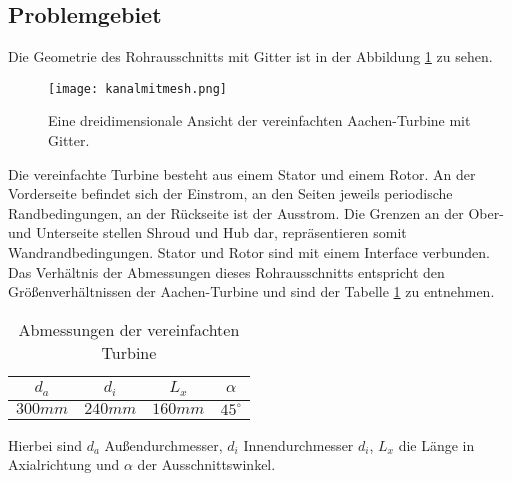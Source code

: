 \subsection{Problemgebiet}
\label{subsec:kanalproblemgebiet}
Die Geometrie des Rohrausschnitts mit Gitter ist in der Abbildung \ref{fig:kanalgebiet} zu sehen.
\begin{figure}[H]
\texttt{[image: kanalmitmesh.png]}
\caption{Eine dreidimensionale Ansicht der vereinfachten Aachen-Turbine mit Gitter.}
\label{fig:kanalgebiet}
\end{figure}
Die vereinfachte Turbine besteht aus einem Stator und einem Rotor. An der Vorderseite befindet sich der Einstrom, an den Seiten jeweils periodische Randbedingungen, an der Rückseite ist der Ausstrom. Die Grenzen an der Ober- und Unterseite stellen Shroud und Hub dar, repräsentieren somit Wandrandbedingungen. Stator und Rotor sind mit einem Interface verbunden. Das Verhältnis der Abmessungen dieses Rohrausschnitts entspricht den Größenverhältnissen der Aachen-Turbine und sind der Tabelle \ref{tab:kanalabmessungen} zu entnehmen.
\begin{table}[H]
\centering
\label{tab:kanalabmessungen}
\caption{Abmessungen der vereinfachten Turbine}
\begin{tabular}{ c| c| c| c}
 $d_a$&$d_i$&$L_x$&$\alpha$\\
\hline
$300mm$&$240mm$&$160mm$&$45^\circ$\\
\end{tabular}
\end{table}
Hierbei sind $d_a$ Außendurchmesser, $d_i$ Innendurchmesser $d_i$, $L_x$ die Länge in Axialrichtung  und $\alpha$ der Ausschnittswinkel.
